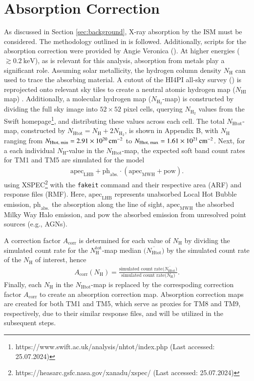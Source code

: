 \section{Absorption Correction}
As discussed in Section \ref{sec:background}, X-ray absorption by the ISM must be considered. The methodology outlined in \cite{Willingale2013} is followed. Additionally, scripts for the absorption correction were provided by Angie Veronica (\cite{veronica2020}). At higher energies (\(\gtrsim \SI{0.2}{\kilo\electronvolt}\)), as is relevant for this analysis, absorption from metals play a significant role. 
Assuming solar metallicity, the hydrogen column density \(N_\text{H}\) can used to trace the absorbing material. A cutout of the HI4PI all-sky survey (\cite{HI4PI2016}) is reprojected onto relevant sky tiles to create a neutral atomic hydrogen map (\(N_{\text{HI}}\)map) . Additionally, a molecular hydrogen map (\(N_{\text{H}_2}\)-map) is constructed by dividing the full sky image into \(52 \times 52\) pixel cells, querying \(N_{\text{H}_2}\) values from the Swift homepage\footnote{https://www.swift.ac.uk/analysis/nhtot/index.php (Last accessed: 25.07.2024)}, and distributing these values across each cell. The total \(N_{\text{Htot}}\)-map, constructed by \(N_{\text{Htot}} = N_{\text{H}} + 2N_{\text{H}_2}\), is shown in Appendix B, with \(N_{\text{H}}\) ranging from \(N_\text{Htot, min} = \SI{2.91e+20}{{\centi\meter}^{-2}}\) to \(N_\text{Htot, max} = \SI{1.61e+21}{{\centi\meter}^{-2}}\).
Next, for a each individual \(N_{\text{H}}\)-value in the \(N_{\text{Htot}}\)-map, the expected soft band count rates for TM1 and TM5 are simulated for the model
\begin{align*}
    \text{apec}_{\text{LHB}} + \text{ph}_\text{abs.}\cdot(\text{apec}_{\text{MWH}} + \text{pow}).
\end{align*}
using XSPEC\footnote{https://heasarc.gsfc.nasa.gov/xanadu/xspec/ (Last accessed: 25.07.2024)} with the \texttt{fakeit} command and their respective area (ARF) and response files (RMF). Here, \(\text{apec}_{\text{LHB}}\) represents unabsorbed Local Hot Bubble emission, \(\text{ph}_\text{abs.}\) the absorption along the line of sight, \(\text{apec}_{\text{MWH}}\) the absorbed Milky Way Halo emission, and \(\text{pow}\) the absorbed emission from unresolved point sources (e.g., AGNs). 

A correction factor \(A_{\text{corr}}\) is determined for each value of \(N_\text{H}\) by dividing the simulated count rate for the \(N_{\text{H}}^{\text{tot}}\)-map median \(\bigl(\overline{N_{\text{Htot}}}\bigr)\) by the simulated count rate of the \(N_{\text{H}}\) of interest, hence
\begin{align*}
    A_{\text{corr}}(N_\text{H}) = \frac{\text{simulated count rate}\bigl(\overline{N_{\text{Htot}}}\bigr)}{\text{simulated count rate}\bigl(N_\text{H}\bigr)}.
\end{align*}
Finally, each \(N_\text{H}\) in the \(N_\text{Htot}\)-map is replaced by the correspoding correction factor \(A_\text{corr}\) to create an absorption correction map. Absorption correction maps are created for both TM1 and TM5, which serve as proxies for TM8 and TM9, respectively, due to their similar response files, and will be utilized in the subsequent steps.
